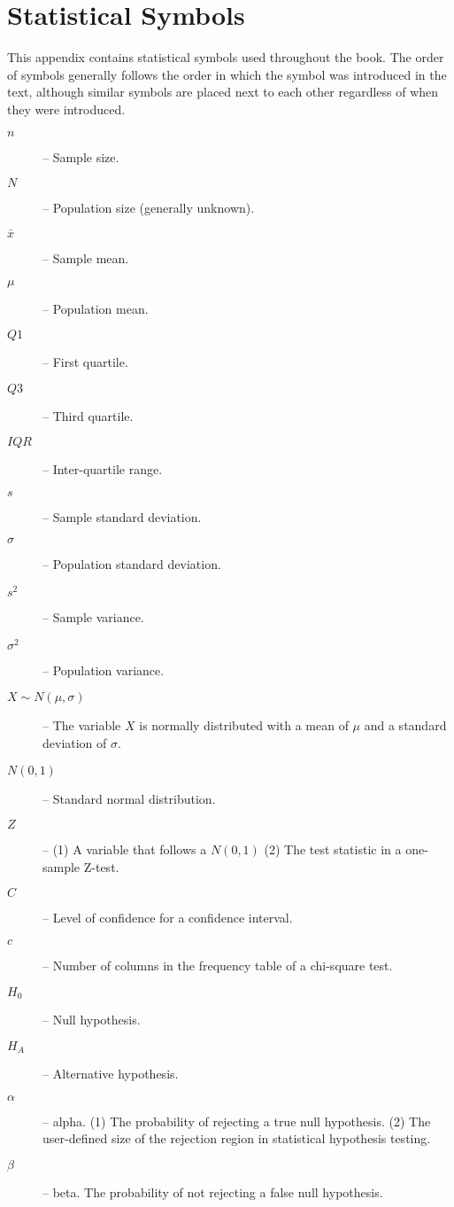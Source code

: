 \chapter{Statistical Symbols}
\vspace{-40pt}
This appendix contains statistical symbols used throughout the book.  The order of symbols generally follows the order in which the symbol was introduced in the text, although similar symbols are placed next to each other regardless of when they were introduced.

\begin{description}
  \item[$n$] -- Sample size.
  \item[$N$] -- Population size (generally unknown).
  \item[$\bar{x}$] -- Sample mean.
  \item[$\mu$] -- Population mean.
  \item[$Q1$] -- First quartile.
  \item[$Q3$] -- Third quartile.
  \item[$IQR$] -- Inter-quartile range.
  \item[$s$] -- Sample standard deviation.
  \item[$\sigma$] -- Population standard deviation.
  \item[$s^{2}$] -- Sample variance.
  \item[$\sigma^{2}$] -- Population variance.
  \item[$X\sim N(\mu,\sigma)$] -- The variable $X$ is normally distributed with a mean of $\mu$ and a standard deviation of $\sigma$.
  \item[$N(0,1)$] -- Standard normal distribution.
  \item[$Z$] -- (1) A variable that follows a $N(0,1)$  (2) The test statistic in a one-sample Z-test.
  \item[$C$] -- Level of confidence for a confidence interval.
  \item[$c$] -- Number of columns in the frequency table of a chi-square test.
  \item[$H_{0}$] -- Null hypothesis.
  \item[$H_{A}$] -- Alternative hypothesis.
  \item[$\alpha$] -- alpha.  (1) The probability of rejecting a true null hypothesis.  (2) The user-defined size of the rejection region in statistical hypothesis testing.
  \item[$\beta$] -- beta.  The probability of not rejecting a false null hypothesis.

\end{description}
